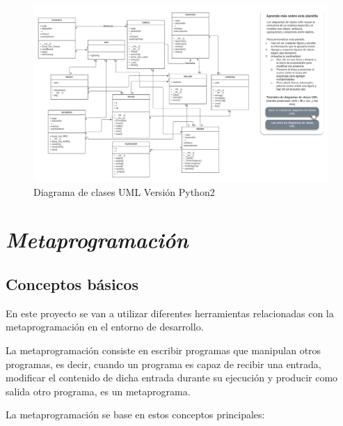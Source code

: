 \documentclass{cosas/tfg_domingo}
\begin{document}
\begin{figure}[ht!] %
\begin{center}
\includegraphics[width=1.45\linewidth]{imagenes/Diagrama en blanco - Clase UML (1).png}
\end{center}
\caption{Diagrama de clases UML Versión Python2}
\label{fig_pro}
\end{figure}



\chapter{\emph{Metaprogramación}}

\section{Conceptos básicos}
En este proyecto se van a utilizar diferentes herramientas relacionadas con la metaprogramación en el entorno de desarrollo.

La metaprogramación consiste en escribir programas que manipulan otros programas, es decir, cuando un programa es capaz de recibir una entrada, modificar el contenido de dicha entrada durante su ejecución y producir como salida otro programa, es un metaprograma.

La metaprogramación se base en estos conceptos principales:
\end{document}
